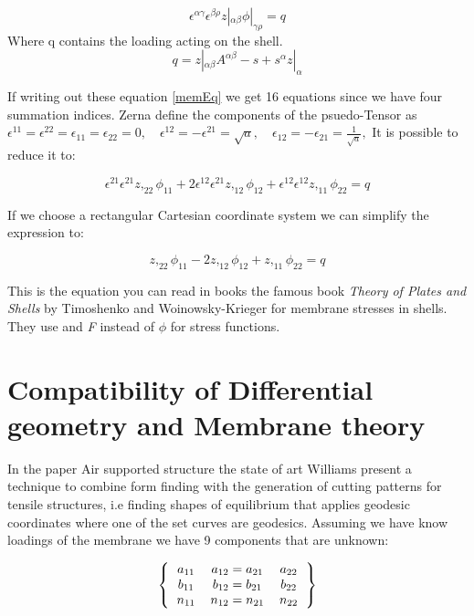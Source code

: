 \begin{equation}\label{memEq}
\epsilon^{\alpha \gamma}\epsilon^{\beta \rho} z|_{\alpha \beta}\phi|_{\gamma \rho} = q
\end{equation}
Where q contains the loading acting on the shell. 
\begin{equation}
q = z|_{\alpha \beta}A^{\alpha \beta} - s + s^\alpha z |_\alpha
\end{equation}

If writing out these equation \ref{memEq} we get 16 equations since we have four summation indices. Zerna define the components of the  psuedo-Tensor as $\epsilon^{11} = \epsilon^{22}=\epsilon_{11}=\epsilon_{22} = 0,\quad \epsilon^{12} = -\epsilon^{21} = \sqrt{a},\quad \epsilon_{12} = -\epsilon_{21} = \frac{1}{\sqrt{a}},$ It is possible to reduce it to:

\begin{equation}
    \epsilon^{21}\epsilon^{21}z,_{22}\phi_{11} + 2\epsilon^{12}\epsilon^{21}z,_{12}\phi_{12} + \epsilon^{12}\epsilon^{12}z,_{11}\phi_{22} = q
\end{equation}

If we choose a rectangular Cartesian coordinate system we can simplify the expression to:

\begin{equation}
    z,_{22}\phi_{11} -2 z,_{12}\phi_{12} + z,_{11}\phi_{22} = q
\end{equation}

This is the equation you can read in books the famous book \textit{Theory of Plates and Shells} by Timoshenko and Woinowsky-Krieger for membrane stresses in shells. They use and \textit{F} instead of $\phi$ for stress functions.



\section{Compatibility of Differential geometry and Membrane theory}

In the paper Air supported structure the state of art Williams present a technique to combine form finding with the generation of cutting patterns for tensile structures, i.e finding shapes of equilibrium that applies geodesic coordinates where one of the set curves are geodesics. 
Assuming we have know loadings of the membrane we have 9 components that are unknown:

\[ 
\left \{
  \begin{tabular}{ccc}
  $a_{11}$  & $a_{12} =a_{21} $ & $a_{22}$ \\
 $b_{11}$  & $b_{12} =b_{21} $ & $b_{22}$\\
  $n_{11}$  & $n_{12} =n_{21} $ & $n_{22}$ 
  \end{tabular}
\right \}
\]

